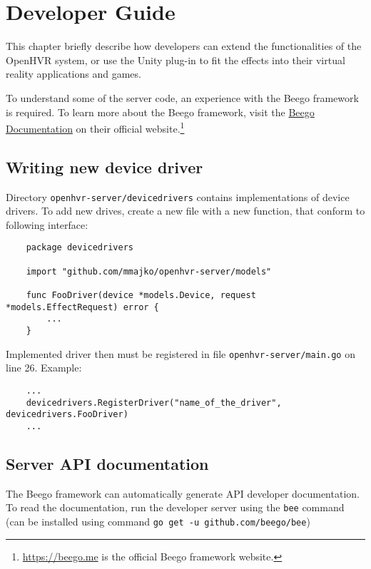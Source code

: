 \chapter{Developer Guide}\label{devguide}

This chapter briefly describe how developers can extend the functionalities
of the OpenHVR system, or use the Unity plug-in to fit the effects 
into their virtual reality applications and games.

To understand some of the server code, an experience with the Beego framework
is required. To learn more about the Beego framework, visit the
\href{https://beego.me/docs/intro/}{Beego Documentation} on their official
website.\footnote{\href{https://beego.me}{https://beego.me} is the official Beego framework website.}

\section*{Writing new device driver}

Directory \verb|openhvr-server/devicedrivers| contains implementations of
device drivers. To add new drives, create a new file with a new function,
that conform to following interface:

\begin{verbatim}
    package devicedrivers

    import "github.com/mmajko/openhvr-server/models"

    func FooDriver(device *models.Device, request *models.EffectRequest) error {
        ...
    }
\end{verbatim}

Implemented driver then must be registered in file \verb|openhvr-server/main.go|
on line 26. Example:

\begin{verbatim}
    ...
    devicedrivers.RegisterDriver("name_of_the_driver", devicedrivers.FooDriver)
    ...
\end{verbatim}

\section*{Server API documentation}

The Beego framework can automatically generate API developer documentation.
To read the documentation, run the developer server using the \verb|bee| command
(can be installed using command \verb|go get -u github.com/beego/bee|)

